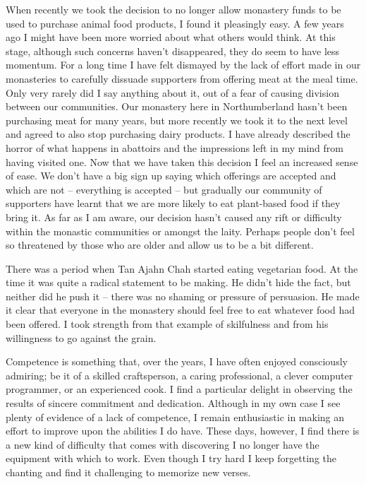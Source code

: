 When recently we took the decision to no longer allow monastery funds to be
used to purchase animal food products, I found it pleasingly easy. A few
years ago I might have been more worried about what others would think.
At this stage, although such concerns haven't disappeared, they do seem
to have less momentum. For a long time I have felt dismayed by the lack
of effort made in our monasteries to carefully dissuade supporters from
offering meat at the meal time. Only very rarely did I say anything
about it, out of a fear of causing division between our communities. Our
monastery here in Northumberland hasn't been purchasing meat for many
years, but more recently we took it to the next level and agreed to also
stop purchasing dairy products. I have already described the horror of
what happens in abattoirs and the impressions left in my mind from
having visited one. Now that we have taken this decision I feel an
increased sense of ease. We don't have a big sign up saying which
offerings are accepted and which are not -- everything is accepted --
but gradually our community of supporters have learnt that we are more
likely to eat plant-based food if they bring it. As far as I am aware,
our decision hasn't caused any rift or difficulty within the monastic
communities or amongst the laity. Perhaps people don't feel so
threatened by those who are older and allow us to be a bit different.

There was a period when Tan Ajahn Chah started eating vegetarian food.
At the time it was quite a radical statement to be making. He didn't
hide the fact, but neither did he push it -- there was no shaming or
pressure of persuasion. He made it clear that everyone in the monastery
should feel free to eat whatever food had been offered. I took strength
from that example of skilfulness and from his willingness to go against
the grain.

Competence is something that, over the years, I have often enjoyed consciously admiring; be it of a skilled craftsperson, a caring
professional, a clever computer programmer, or an experienced cook. I
find a particular delight in observing the results of sincere commitment
and dedication. Although in my own case I see plenty of evidence of a
lack of competence, I remain enthusiastic in making an effort to improve
upon the abilities I do have. These days, however, I find there is a new
kind of difficulty that comes with discovering I no longer have the
equipment with which to work. Even though I try hard I keep forgetting the chanting and find it challenging to memorize new verses.

